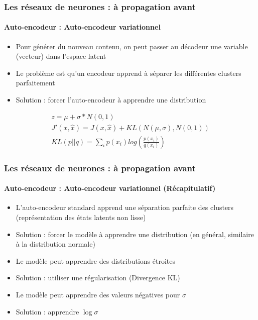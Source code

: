 \documentclass[xcolor=table]{beamer}
\begin{document}
\begin{frame}
\frametitle{Les réseaux de neurones : à propagation avant}
\framesubtitle{Auto-encodeur : Auto-encodeur variationnel}

\begin{itemize}
	\item Pour générer du nouveau contenu, on peut passer au décodeur une variable (vecteur) dans l'espace latent
	\item Le problème est qu'un encodeur apprend à séparer les différentes clusters parfaitement  
	\item Solution : forcer l'auto-encodeur à apprendre une distribution  
\end{itemize}

\begin{minipage}{0.60\textwidth} 
	\begin{align*}
	z = \mu + \sigma * N(0, 1) \\
	J'(x, \hat{x}) = J(x, \hat{x}) + KL(N(\mu, \sigma), N(0, 1)) \\
	KL(p||q) = \sum_i p(x_i) log(\frac{p(x_i)}{q(x_i)})
	\end{align*}
\end{minipage}
%
\begin{minipage}{0.39\textwidth}
\end{minipage}

\end{frame}

\begin{frame}
\frametitle{Les réseaux de neurones : à propagation avant}
\framesubtitle{Auto-encodeur : Auto-encodeur variationnel (Récapitulatif)}

\begin{itemize}
	\item L'auto-encodeur standard apprend une séparation parfaite des clusters (représentation des états latents non lisse)
	\item Solution : forcer le modèle à apprendre une distribution (en général, similaire à la distribution normale)
	\item Le modèle peut apprendre des distributions étroites 
	\item Solution : utiliser une régularisation (Divergence KL)
	\item Le modèle peut apprendre des valeurs négatives pour $\sigma$
	\item Solution : apprendre $\log \sigma$
\end{itemize}

\end{frame}
\end{document}
